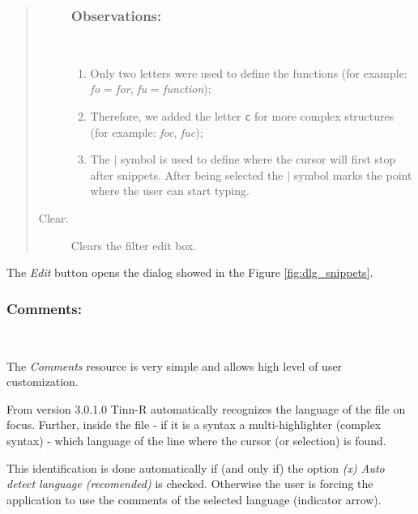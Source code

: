 \begin{quote}
\begin{footnotesize}
\begin{description}
        \subsubsection{Observations:}\\
        \begin{enumerate}
          \item Only two letters were used to define the functions (for example:
            \textit{fo} = \textit{for}, \textit{fu} = \textit{function});
          \item Therefore, we added the letter \texttt{c} for more complex
            structures (for example: \textit{foc}, \textit{fuc});
          \item The \texttt{$|$} symbol is used to define where the cursor
            will first stop after snippets. After being selected
            the \texttt{$|$} symbol marks the point where the user can start
            typing.
        \end{enumerate}
      \item [Clear:]
        Clears the filter edit box.
    \end{description}
  \end{footnotesize}
\end{quote}

The \textit{Edit} button opens the dialog showed in the Figure \ref{fig:dlg_snippets}.


\subsubsection{Comments:}\\

The \textit{Comments} resource is very simple and allows high level
of user customization.

From version 3.0.1.0 Tinn-R automatically recognizes the
language of the file on focus. Further, inside the file
- if it is a syntax a multi-highlighter (complex syntax) - which language of
the line where the cursor (or selection) is found.

This identification is done automatically if (and only if) the option
\textit{(x) Auto detect language (recomended)} is checked. Otherwise
the user is forcing the application to use the comments of the selected language
(indicator arrow).

